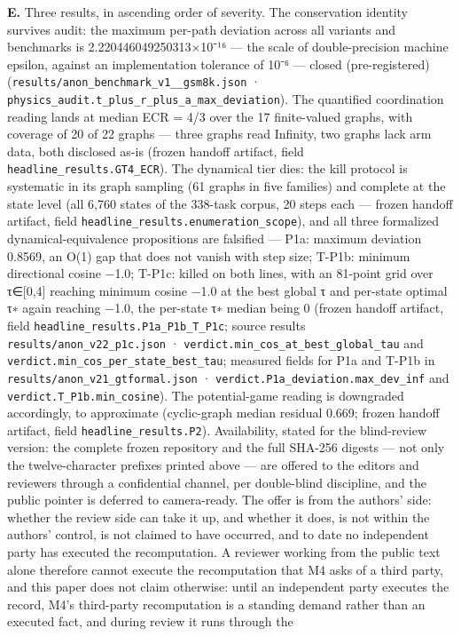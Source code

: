 \documentclass[11pt,a4paper]{article}
\begin{document}
\textbf{E.} Three results, in ascending order of severity. The conservation identity survives audit: the maximum per-path deviation across all variants and benchmarks is 2.220446049250313×10⁻¹⁶ — the scale of double-precision machine epsilon, against an implementation tolerance of 10⁻⁶ — closed (pre-registered) (\texttt{results/\allowbreak anon\_\allowbreak benchmark\_\allowbreak v1\_\_\allowbreak gsm8k.json} · \texttt{physics\_\allowbreak audit.t\_\allowbreak plus\_\allowbreak r\_\allowbreak plus\_\allowbreak a\_\allowbreak max\_\allowbreak deviation}). The quantified coordination reading lands at median ECR = 4/3 over the 17 finite-valued graphs, with coverage of 20 of 22 graphs — three graphs read Infinity, two graphs lack arm data, both disclosed as-is (frozen handoff artifact, field \texttt{headline\_\allowbreak results.GT4\_\allowbreak ECR}). The dynamical tier dies: the kill protocol is systematic in its graph sampling (61 graphs in five families) and complete at the state level (all 6,760 states of the 338-task corpus, 20 steps each — frozen handoff artifact, field \texttt{headline\_\allowbreak results.enumeration\_\allowbreak scope}), and all three formalized dynamical-equivalence propositions are falsified — P1a: maximum deviation 0.8569, an O(1) gap that does not vanish with step size; T-P1b: minimum directional cosine −1.0; T-P1c: killed on both lines, with an 81-point grid over τ∈[0,4] reaching minimum cosine −1.0 at the best global τ and per-state optimal τ∗ again reaching −1.0, the per-state τ∗ median being 0 (frozen handoff artifact, field \texttt{headline\_\allowbreak results.P1a\_\allowbreak P1b\_\allowbreak T\_\allowbreak P1c}; source results \texttt{results/\allowbreak anon\_\allowbreak v22\_\allowbreak p1c.json} · \texttt{verdict.min\_\allowbreak cos\_\allowbreak at\_\allowbreak best\_\allowbreak global\_\allowbreak tau} and \texttt{verdict.min\_\allowbreak cos\_\allowbreak per\_\allowbreak state\_\allowbreak best\_\allowbreak tau}; measured fields for P1a and T-P1b in \texttt{results/\allowbreak anon\_\allowbreak v21\_\allowbreak gtformal.json} · \texttt{verdict.P1a\_\allowbreak deviation.max\_\allowbreak dev\_\allowbreak inf} and \texttt{verdict.T\_\allowbreak P1b.min\_\allowbreak cosine}). The potential-game reading is downgraded accordingly, to approximate (cyclic-graph median residual 0.669; frozen handoff artifact, field \texttt{headline\_\allowbreak results.P2}). Availability, stated for the blind-review version: the complete frozen repository and the full SHA-256 digests — not only the twelve-character prefixes printed above — are offered to the editors and reviewers through a confidential channel, per double-blind discipline, and the public pointer is deferred to camera-ready. The offer is from the authors' side: whether the review side can take it up, and whether it does, is not within the authors' control, is not claimed to have occurred, and to date no independent party has executed the recomputation. A reviewer working from the public text alone therefore cannot execute the recomputation that M4 asks of a third party, and this paper does not claim otherwise: until an independent party executes the record, M4's third-party recomputation is a standing demand rather than an executed fact, and during review it runs through the 
\end{document}

